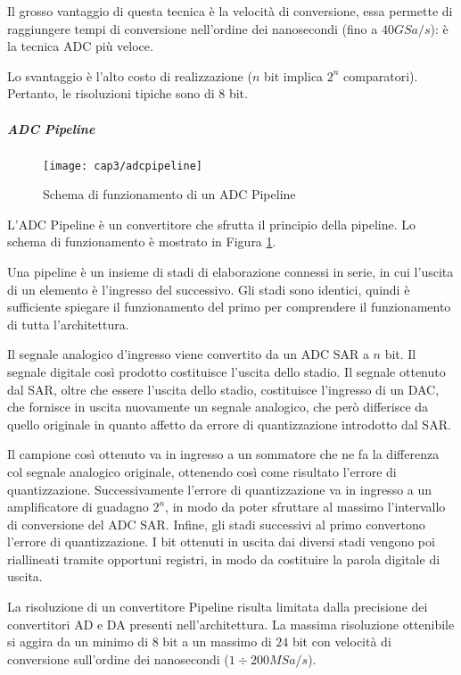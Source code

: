 Il grosso vantaggio di questa tecnica è la velocità di conversione, essa permette di raggiungere tempi di conversione nell'ordine dei nanosecondi (fino a $40 GSa/s$): è la tecnica ADC più veloce. 

Lo svantaggio è l'alto costo di realizzazione ($n$ bit implica $2^n$ comparatori). Pertanto, le risoluzioni tipiche sono di $8$ bit.

\subparagraph{\textbf{ADC Pipeline}}
\begin{figure}  
  \begin{center}
    \texttt{[image: cap3/adcpipeline]}
    \caption{Schema di funzionamento di un ADC Pipeline }
    \label{adcpipeline}
  \end{center}
\end{figure}
L'ADC Pipeline è un convertitore che sfrutta il principio della pipeline. Lo schema di funzionamento è mostrato in Figura \ref{adcpipeline}.

Una pipeline è un insieme di stadi di elaborazione connessi in serie, in cui l'uscita di un elemento è l'ingresso del successivo. Gli stadi sono identici, quindi è sufficiente spiegare il funzionamento del primo per comprendere il funzionamento di tutta l'architettura.

Il segnale analogico d'ingresso viene convertito da un ADC SAR a $n$ bit. Il segnale digitale così prodotto costituisce l'uscita dello stadio. Il segnale ottenuto dal SAR, oltre che essere l'uscita dello stadio, costituisce l'ingresso di un DAC, che fornisce in uscita nuovamente un segnale analogico, che però differisce da quello originale in quanto affetto da errore di quantizzazione introdotto dal SAR.

Il campione così ottenuto va in ingresso a un sommatore che ne fa la differenza col segnale analogico originale, ottenendo così come risultato l'errore di quantizzazione. Successivamente l'errore di quantizzazione va in ingresso a un amplificatore di guadagno $2^n$, in modo da poter sfruttare al massimo l'intervallo di conversione del ADC SAR. Infine, gli stadi successivi al primo convertono l'errore di quantizzazione. I bit ottenuti in uscita dai diversi stadi vengono poi riallineati tramite opportuni registri, in modo da costituire la parola digitale di uscita. 

La risoluzione di un convertitore Pipeline risulta limitata dalla precisione dei convertitori AD e DA presenti nell'architettura. La massima risoluzione ottenibile si aggira da un minimo di $8$ bit a un massimo di $24$ bit  con velocità di conversione sull'ordine dei nanosecondi ($1 \div 200 MSa/s$). 

